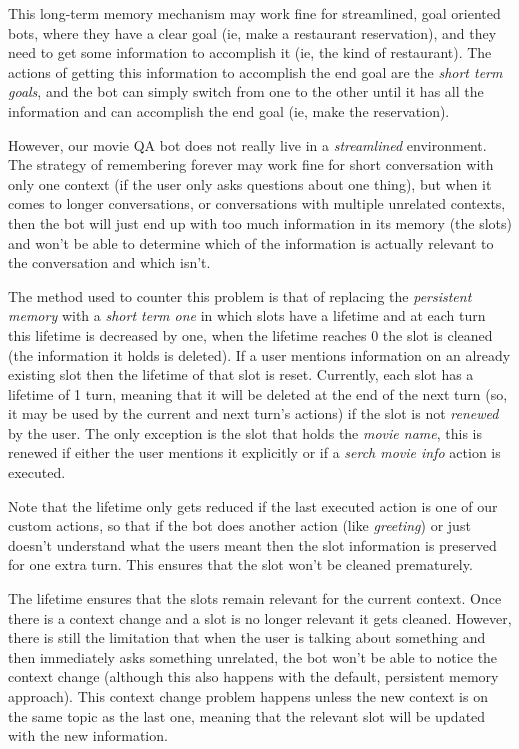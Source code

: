 \documentclass[11pt,a4paper]{article}
\begin{document}
			This long-term memory mechanism may work fine for streamlined, goal oriented bots, where they have a clear goal (ie, make a restaurant reservation), and they need to get some information to accomplish it (ie, the kind of restaurant). The actions of getting this information to accomplish the end goal are the \textit{short term goals}, and the bot can simply switch from one to the other until it has all the information and can accomplish the end goal (ie, make the reservation). 
			
			However, our movie QA bot does not really live in a \textit{streamlined} environment. The strategy of remembering forever may work fine for short conversation with only one context (if the user only asks questions about one thing), but when it comes to longer conversations, or conversations with multiple unrelated contexts, then the bot will just end up with too much information in its memory (the slots) and won't be able to determine which of the information is actually relevant to the conversation and which isn't.
			
			The method used to counter this problem is that of replacing the \textit{persistent memory} with a \textit{short term one} in which slots have a lifetime and at each turn this lifetime is decreased by one, when the lifetime reaches 0 the slot is cleaned (the information it holds is deleted). If a user mentions information on an already existing slot then the lifetime of that slot is reset. Currently, each slot has a lifetime of 1 turn, meaning that it will be deleted at the end of the next turn (so, it may be used by the current and next turn's actions) if the slot is not \textit{renewed} by the user. The only exception is the slot that holds the \textit{movie name}, this is renewed if either the user mentions it explicitly or if a \textit{serch movie info} action is executed. 
			
			Note that the lifetime only gets reduced if the last executed action is one of our custom actions, so that if the bot does another action (like \textit{greeting}) or just doesn't understand what the users meant then the slot information is preserved for one extra turn. This ensures that the slot won't be cleaned prematurely.
			
			The lifetime ensures that the slots remain relevant for the current context. Once there is a context change and a slot is no longer relevant it gets cleaned. However, there is still the limitation that when the user is talking about something and then immediately asks something unrelated, the bot won't be able to notice the context change (although this also happens with the default, persistent memory approach). This context change problem happens unless the new context is on the same topic as the last one, meaning that the relevant slot will be updated with the new information.
			
\end{document}
